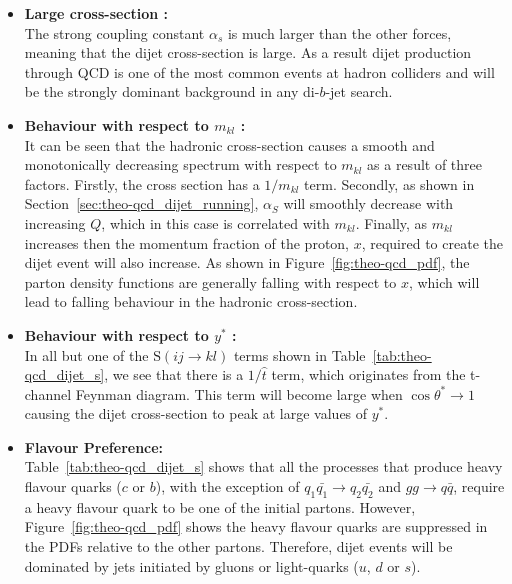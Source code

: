 \begin{itemize}[leftmargin=*]
\item\textbf{Large cross-section :}\\
  The strong coupling constant $\alpha_s$ is much larger than the other forces,
  meaning that the dijet cross-section is large.
  As a result dijet production through QCD is one of the most common events at hadron colliders
  and will be the strongly dominant background in any di-$b$-jet search.\vspace{0.5em}
  
\item\textbf{Behaviour with respect to $m_{kl}$ :}\\
  It can be seen that the hadronic cross-section causes
  a smooth and monotonically decreasing spectrum
  with respect to $m_{kl}$ as a result of three factors.
  Firstly, the cross section has a $1/m_{kl}$ term.
  Secondly, as shown in Section~\ref{sec:theo-qcd_dijet_running},
  $\alpha_S$ will smoothly decrease with increasing $Q$, which in this case is correlated with $m_{kl}$.
  Finally, as $m_{kl}$ increases then the momentum fraction of the proton, $x$, required to create
  the dijet event will also increase.
  As shown in Figure~\ref{fig:theo-qcd_pdf}, the parton density functions are generally falling 
  with respect to $x$, which will lead to falling behaviour in the hadronic cross-section.
  \vspace{0.5em}
  
\item\textbf{Behaviour with respect to $y^*$ :}\\
  In all but one of the $\text{S}(ij \to kl)$ terms shown in Table~\ref{tab:theo-qcd_dijet_s},
  we see that there is a $1/\hat{t}$ term, which originates from the t-channel Feynman diagram.
  This term will become large when $\cos{\theta^*} \to 1$
  causing the dijet cross-section to peak at large values of $y^*$.
  \vspace{0.5em}

\item\textbf{Flavour Preference:}\\
  Table~\ref{tab:theo-qcd_dijet_s} shows that all the processes that produce heavy flavour quarks ($c$ or $b$),
  with the exception of $q_1 \bar{q_1} \to q_2 \bar{q_2}$ and $g g \to q \bar{q}$,
  require a heavy flavour quark to be one of the initial partons.
  However, Figure~\ref{fig:theo-qcd_pdf} shows the heavy flavour quarks are suppressed in
  the PDFs relative to the other partons.
  Therefore, dijet events will be dominated by jets initiated by gluons or light-quarks ($u$, $d$ or $s$).
  
  
\end{itemize}

